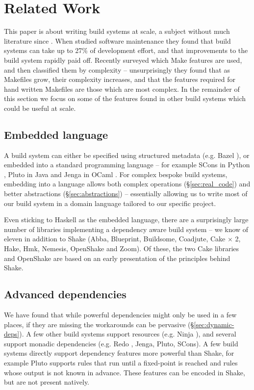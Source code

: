 \section{Related Work\label{section-review}}

This paper is about writing build systems at scale, a subject without much literature since \citet{miller:recursive_make}. When \citet{mcintosh:build_maintenance_effort} studied software maintenance they found that build systems can take up to 27\% of development effort, and that improvements to the build system rapidly paid off. Recently \citet{martin:make_it_simple} surveyed which Make features are used, and then \citet{martin:maintenance_complexity_makefiles} classified them by complexity -- unsurprisingly they found that as Makefiles grow, their complexity increases, and that the features required for hand written Makefiles are those which are most complex. In the remainder of this section we focus on some of the features found in other build systems which could be useful at scale.

\subsection{Embedded language}

A build system can either be specified using structured metadata (e.g. Bazel \cite{bazel}), or embedded into a standard programming language -- for example SCons in Python \cite{scons}, Pluto in Java \cite{pluto} and Jenga in OCaml \cite{jenga}. For complex bespoke build systems, embedding into a language allows both complex operations (\S\ref{sec:real_code}) and better abstractions (\S\ref{sec:abstractions}) -- essentially allowing us to write most of our build system in a domain language tailored to our specific project.

Even sticking to Haskell as the embedded language, there are a surprisingly large number of libraries implementing a dependency aware build system -- we know of eleven in addition to Shake (Abba, Blueprint, Buildsome, Coadjute, Cake $\times$ 2, Hake, Hmk, Nemesis, OpenShake and Zoom). Of these, the two Cake libraries and OpenShake are based on an early presentation of the principles behind Shake.

\subsection{Advanced dependencies}

We have found that while powerful dependencies might only be used in a few places, if they are missing the workarounds can be pervasive (\S\ref{sec:dynamic-deps}). A few other build systems support resources (e.g. Ninja \cite{ninja}), and several support monadic dependencies (e.g. Redo \cite{redo}, Jenga, Pluto, SCons). A few build systems directly support dependency features more powerful than Shake, for example Pluto supports rules that run until a fixed-point is reached and rules whose output is not known in advance. These features can be encoded in Shake, but are not present natively.

